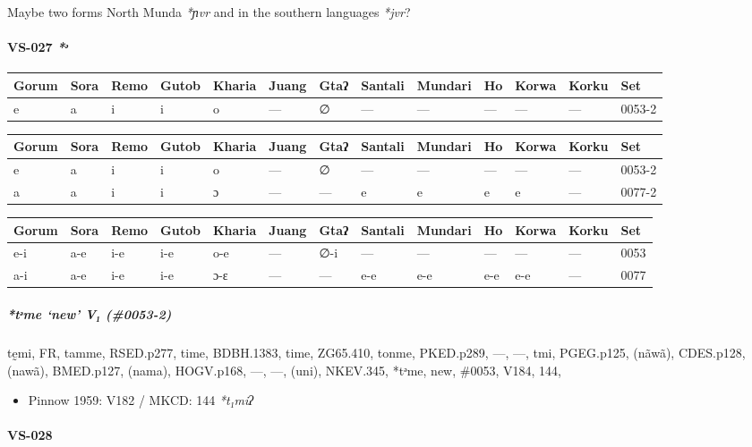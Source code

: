 \documentclass[a4paper,]{article}
\providecommand{\tightlist}{%
  \setlength{\itemsep}{0pt}\setlength{\parskip}{0pt}}
\let\oldparagraph\paragraph
\renewcommand{\paragraph}[1]{\oldparagraph{#1}\mbox{}}
\let\oldsubparagraph\subparagraph
\renewcommand{\subparagraph}[1]{\oldsubparagraph{#1}\mbox{}}
\begin{document}
Maybe two forms North Munda \emph{*ɲvr} and in the southern languages
\emph{*jvr}?

\paragraph{\texorpdfstring{VS-027
\emph{*ᵊ}}{VS-027 *ᵊ}}\label{vs-027-ux1d4a}

\begin{longtable}[]{@{}lllllllllllll@{}}
\toprule
Gorum & Sora & Remo & Gutob & Kharia & Juang & Gtaʔ & Santali & Mundari
& Ho & Korwa & Korku & Set\tabularnewline
\midrule
\endhead
e & a & i & i & o & --- & ∅ & --- & --- & --- & --- & --- &
0053-2\tabularnewline
\bottomrule
\end{longtable}

\begin{longtable}[]{@{}lllllllllllll@{}}
\toprule
Gorum & Sora & Remo & Gutob & Kharia & Juang & Gtaʔ & Santali & Mundari
& Ho & Korwa & Korku & Set\tabularnewline
\midrule
\endhead
e & a & i & i & o & --- & ∅ & --- & --- & --- & --- & --- &
0053-2\tabularnewline
a & a & i & i & ɔ & --- & --- & e & e & e & e & --- &
0077-2\tabularnewline
\bottomrule
\end{longtable}

\begin{longtable}[]{@{}lllllllllllll@{}}
\toprule
Gorum & Sora & Remo & Gutob & Kharia & Juang & Gtaʔ & Santali & Mundari
& Ho & Korwa & Korku & Set\tabularnewline
\midrule
\endhead
e-i & a-e & i-e & i-e & o-e & --- & ∅-i & --- & --- & --- & --- & --- &
0053\tabularnewline
a-i & a-e & i-e & i-e & ɔ-ɛ & --- & --- & e-e & e-e & e-e & e-e & --- &
0077\tabularnewline
\bottomrule
\end{longtable}

\subparagraph{\texorpdfstring{\emph{*tᵊme} `new' V₁
(\#0053-2)}{*tᵊme new V₁ (\#0053-2)}}\label{tux1d4ame-new-v-0053-2}

tḛmi, FR, tamme, RSED.p277, time, BDBH.1383, time, ZG65.410, tonme,
PKED.p289, ---, ---, tmi, PGEG.p125, (nãwã), CDES.p128, (nawã),
BMED.p127, (nama), HOGV.p168, ---, ---, (uni), NKEV.345, *tᵊme, new,
\#0053, V184, 144,

\begin{itemize}
\tightlist
\item
  Pinnow 1959: V182 / MKCD: 144 \emph{*t₁miʔ}
\end{itemize}

\paragraph{VS-028}\label{vs-028}
\end{document}
